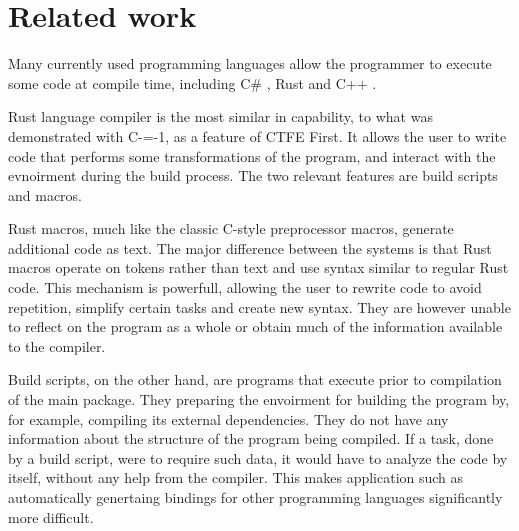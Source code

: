 \section{Related work}
\label{related-work}

Many currently used programming languages allow the programmer to execute some code at compile time, including C\# \cite{csharp:source_generators,roslyn}, Rust \cite{rust, klabnik2019rust} and C++ \cite{ISO:cpp20}.

Rust language compiler is the most similar in capability, to what was demonstrated with C-=-1, as a feature of CTFE First.
It allows the user to write code that performs some transformations of the program, and interact with the evnoirment during the build process.
The two relevant features are build scripts and macros.

Rust macros, much like the classic C-style preprocessor macros, generate additional code as text.
The major difference between the systems is that Rust macros operate on tokens rather than text and use syntax similar to regular Rust code.
This mechanism is powerfull, allowing the user to rewrite code to avoid repetition, simplify certain tasks and create new syntax.
They are however unable to reflect on the program as a whole or obtain much of the information available to the compiler.

Build scripts, on the other hand, are programs that execute prior to compilation of the main package.
They preparing the envoirment for building the program by, for example, compiling its external dependencies.
They do not have any information about the structure of the program being compiled.
If a task, done by a build script, were to require such data, it would have to analyze the code by itself, without any help from the compiler.
This makes application such as automatically genertaing bindings for other programming languages significantly more difficult.
